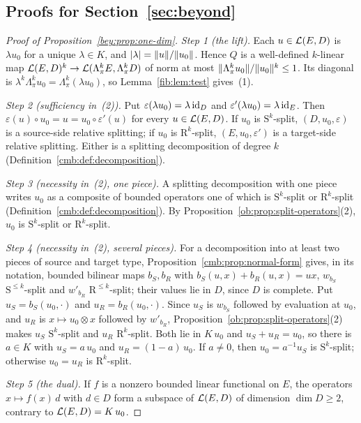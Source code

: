 \subsection{Proofs for Section~\ref{sec:beyond}}\label{dfr:ssec:beyond}

\begin{proof}[Proof of Proposition~\ref{bey:prop:one-dim}]
\emph{Step 1 (the lift).} Each $u\in\mathcal L(E,D)$ is $\lambda u_0$ for a unique $\lambda\in K$, and
$\lvert \lambda\rvert=\lVert u\rVert/\lVert u_0\rVert$. Hence $Q$ is a well-defined $k$\nobreakdash-linear map
$\mathcal L(E,D)^k\to\mathcal L(\Lambda^k_\pi E,\Lambda^k_\pi D)$ of norm at most $\lVert \Lambda^k_\pi u_0\rVert/\lVert u_0\rVert^k\le1$. Its
diagonal is $\lambda^k\Lambda^k_\pi u_0=\Lambda^k_\pi(\lambda u_0)$, so Lemma~\ref{fib:lem:test} gives~(1).

\emph{Step 2 (sufficiency in~(2)).} Put $\varepsilon(\lambda u_0)=\lambda\,\mathrm{id}_D$ and
$\varepsilon'(\lambda u_0)=\lambda\,\mathrm{id}_E$. Then $\varepsilon(u)\circ u_0=u=u_0\circ\varepsilon'(u)$ for every
$u\in\mathcal L(E,D)$. If $u_0$ is $\mathrm S^k$-split, $(D,u_0,\varepsilon)$ is a source-side relative splitting; if $u_0$ is
$\mathrm R^k$-split, $(E,u_0,\varepsilon')$ is a target-side relative splitting. Either is a splitting decomposition of
degree $k$ (Definition~\ref{cmb:def:decomposition}).

\emph{Step 3 (necessity in~(2), one piece).} A splitting decomposition with one piece writes $u_0$ as a composite of
bounded operators one of which is $\mathrm S^k$-split or $\mathrm R^k$-split (Definition~\ref{cmb:def:decomposition}).
By Proposition~\ref{ob:prop:split-operators}(2), $u_0$ is $\mathrm S^k$-split or $\mathrm R^k$-split.

\emph{Step 4 (necessity in~(2), several pieces).} For a decomposition into at least two pieces of source and target
type, Proposition~\ref{cmb:prop:normal-form} gives, in its notation, bounded bilinear maps $b_S,b_R$ with
$b_S(u,x)+b_R(u,x)=ux$, $w_{b_S}$ $\mathrm S^{\le k}$-split and $w'_{b_R}$ $\mathrm R^{\le k}$-split; their values lie in
$D$, since $D$ is complete. Put $u_S=b_S(u_0,\cdot)$ and $u_R=b_R(u_0,\cdot)$. Since $u_S$ is $w_{b_S}$ followed by
evaluation at $u_0$, and $u_R$ is $x\mapsto u_0\otimes x$ followed by $w'_{b_R}$,
Proposition~\ref{ob:prop:split-operators}(2) makes $u_S$ $\mathrm S^k$-split and $u_R$ $\mathrm R^k$-split. Both
lie in $K\,u_0$ and $u_S+u_R=u_0$, so there is $a\in K$ with $u_S=a\,u_0$ and $u_R=(1-a)\,u_0$. If $a\ne0$, then
$u_0=a^{-1}u_S$ is $\mathrm S^k$-split; otherwise $u_0=u_R$ is $\mathrm R^k$-split.

\emph{Step 5 (the dual).} If $f$ is a nonzero bounded linear functional on $E$, the operators $x\mapsto f(x)\,d$ with
$d\in D$ form a subspace of $\mathcal L(E,D)$ of dimension $\dim D\ge2$, contrary to $\mathcal L(E,D)=K\,u_0$.
\end{proof}
